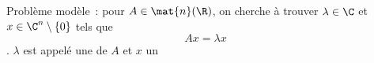 \par{Problème modèle~:} pour $A \in \mat{n}(\R)$, on cherche à trouver $\lambda \in \C$ et $x \in \C^n\setminus\{0\}$ tels que $$Ax = \lambda x$$. $\lambda$ est appelé une  de $A$ et $x$ un \notion